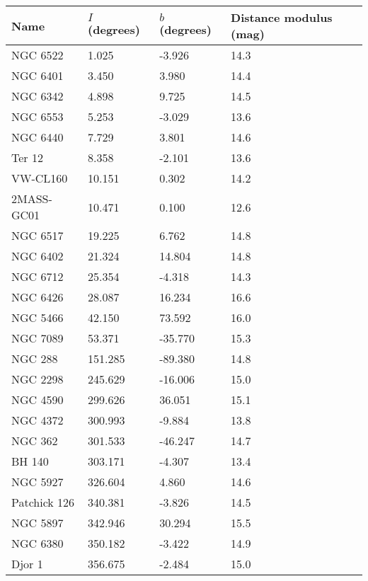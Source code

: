 \documentclass[10pt]{article}
\begin{document}
\begin{center}
\begin{tabular}{|l|l|l|l|}
\hline
Name & $I$ (degrees) & $b$ (degrees) & Distance modulus (mag) \\
\hline
NGC 6522 & 1.025 & -3.926 & 14.3 \\
\hline
NGC 6401 & 3.450 & 3.980 & 14.4 \\
\hline
NGC 6342 & 4.898 & 9.725 & 14.5 \\
\hline
NGC 6553 & 5.253 & -3.029 & 13.6 \\
\hline
NGC 6440 & 7.729 & 3.801 & 14.6 \\
\hline
Ter 12 & 8.358 & -2.101 & 13.6 \\
\hline
VW-CL160 & 10.151 & 0.302 & 14.2 \\
\hline
2MASS-GC01 & 10.471 & 0.100 & 12.6 \\
\hline
NGC 6517 & 19.225 & 6.762 & 14.8 \\
\hline
NGC 6402 & 21.324 & 14.804 & 14.8 \\
\hline
NGC 6712 & 25.354 & -4.318 & 14.3 \\
\hline
NGC 6426 & 28.087 & 16.234 & 16.6 \\
\hline
NGC 5466 & 42.150 & 73.592 & 16.0 \\
\hline
NGC 7089 & 53.371 & -35.770 & 15.3 \\
\hline
NGC 288 & 151.285 & -89.380 & 14.8 \\
\hline
NGC 2298 & 245.629 & -16.006 & 15.0 \\
\hline
NGC 4590 & 299.626 & 36.051 & 15.1 \\
\hline
NGC 4372 & 300.993 & -9.884 & 13.8 \\
\hline
NGC 362 & 301.533 & -46.247 & 14.7 \\
\hline
BH 140 & 303.171 & -4.307 & 13.4 \\
\hline
NGC 5927 & 326.604 & 4.860 & 14.6 \\
\hline
Patchick 126 & 340.381 & -3.826 & 14.5 \\
\hline
NGC 5897 & 342.946 & 30.294 & 15.5 \\
\hline
NGC 6380 & 350.182 & -3.422 & 14.9 \\
\hline
Djor 1 & 356.675 & -2.484 & 15.0 \\
\hline
\end{tabular}
\end{center}
\end{document}
